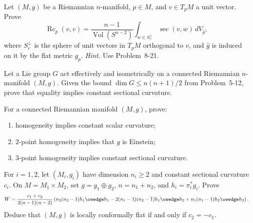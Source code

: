 \begin{exercise}
\label{prob:ricci-curvature-without-basis}

Let $(M,g)$ be a Riemannian $n$-manifold, $p\in M$, and
$v\in T_pM$ a unit vector. Prove
\[
\operatorname{Rc}_p(v,v)
=\frac{n-1}{\operatorname{Vol}(S^{n-2})}
\int_{w\in S_v^\perp}\sec(v,w)\,dV_{\widehat g},
\]
where $S_v^\perp$ is the sphere of unit vectors in $T_pM$ orthogonal to $v$,
and $\widehat g$ is induced on it by the flat metric $g_p$.
\emph{Hint.} Use Problem~8-21.
\end{exercise}

\begin{exercise}
\label{prob:lie-group-isometric-action-dimension}

Let a Lie group $G$ act effectively and isometrically on a connected
Riemannian $n$-manifold $(M,g)$. Given the bound
$\dim G\leq n(n+1)/2$ from Problem~5-12, prove that equality implies constant
sectional curvature.
\end{exercise}

\begin{exercise}
\label{prob:k-point-homogeneous-ch8}

For a connected Riemannian manifold $(M,g)$, prove:
\begin{enumerate}
\item[(a)] homogeneity implies constant scalar curvature;
\item[(b)] $2$-point homogeneity implies that $g$ is Einstein;
\item[(c)] $3$-point homogeneity implies constant sectional curvature.
\end{enumerate}
\end{exercise}

\begin{exercise}
\label{prob:weyl-tensor-product-metric}

For $i=1,2$, let $(M_i,g_i)$ have dimension $n_i\geq2$ and constant
sectional curvature $c_i$. On $M=M_1\times M_2$, set
$g=g_1\oplus g_2$, $n=n_1+n_2$, and $h_i=\pi_i^*g_i$. Prove
\[
W=\frac{c_1+c_2}{2(n-1)(n-2)}
\left(
n_2(n_2-1)h_1\owedge h_1
-2(n_1-1)(n_2-1)h_1\owedge h_2
+n_1(n_1-1)h_2\owedge h_2
\right).
\]
Deduce that $(M,g)$ is locally conformally flat if and only if
$c_2=-c_1$.
\end{exercise}

